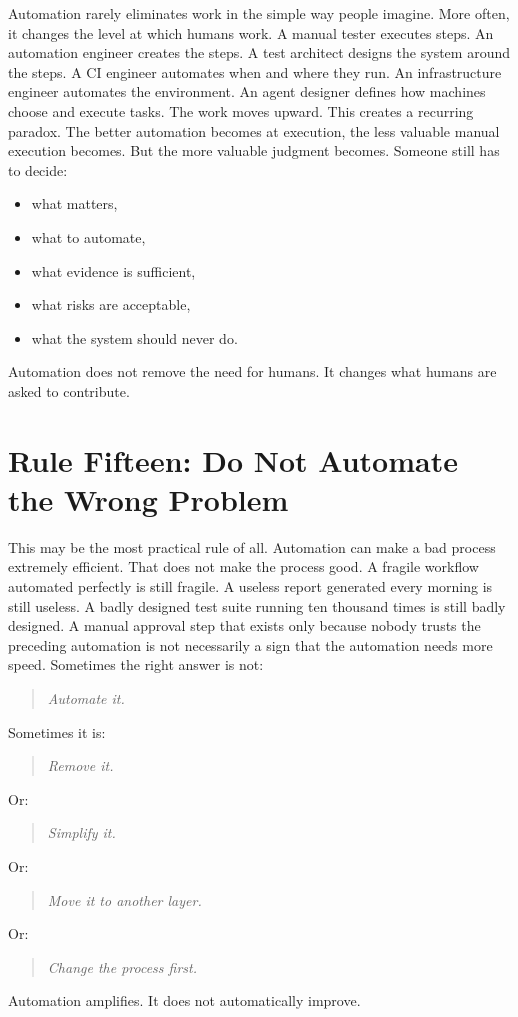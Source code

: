 \documentclass[11pt,twoside]{book}
\begin{document}
Automation rarely eliminates work in the simple way people imagine.
More often, it changes the level at which humans work.
A manual tester executes steps.
An automation engineer creates the steps.
A test architect designs the system around the steps.
A CI engineer automates when and where they run.
An infrastructure engineer automates the environment.
An agent designer defines how machines choose and execute tasks.
The work moves upward.
This creates a recurring paradox.
The better automation becomes at execution, the less valuable manual execution becomes.
But the more valuable judgment becomes.
Someone still has to decide:
\begin{itemize}[nosep]
    \item what matters,
    \item what to automate,
    \item what evidence is sufficient,
    \item what risks are acceptable,
    \item what the system should never do.
\end{itemize}
Automation does not remove the need for humans.
It changes what humans are asked to contribute.

\section*{Rule Fifteen: Do Not Automate the Wrong Problem}

This may be the most practical rule of all.
Automation can make a bad process extremely efficient.
That does not make the process good.
A fragile workflow automated perfectly is still fragile.
A useless report generated every morning is still useless.
A badly designed test suite running ten thousand times is still badly designed.
A manual approval step that exists only because nobody trusts the preceding automation is not necessarily a sign that the automation needs more speed.
Sometimes the right answer is not:
\begin{quote}
\emph{Automate it.}
\end{quote}
Sometimes it is:
\begin{quote}
\emph{Remove it.}
\end{quote}
Or:
\begin{quote}
\emph{Simplify it.}
\end{quote}
Or:
\begin{quote}
\emph{Move it to another layer.}
\end{quote}
Or:
\begin{quote}
\emph{Change the process first.}
\end{quote}
Automation amplifies.
It does not automatically improve.
\end{document}
